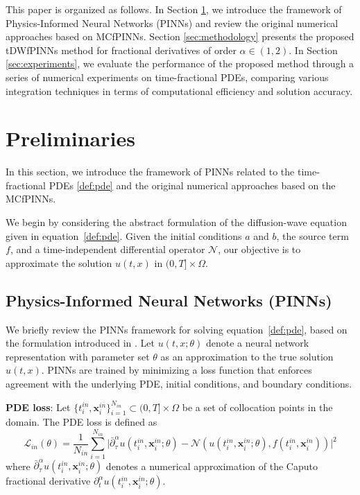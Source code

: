 \documentclass[preprint,3p,times]{elsarticle}
\def\al{\alpha}
\def\x{\mathbf{x}}
\def\L{\mathcal{L}}
\def\N{\mathcal{N}}
\def\al{\alpha}
\def\dta{\partial_t^\alpha}
\def\btau{\bar\partial_\tau^\al}
\begin{document}
This paper is organized as follows. In Section \ref{sec:setup}, we introduce the framework of Physics-Informed Neural Networks (PINNs) and review the original numerical approaches based on MCfPINNs. Section \ref{sec:methodology} presents the proposed tDWfPINNs method for fractional derivatives of order $\alpha \in (1, 2)$. In Section \ref{sec:experiments}, we evaluate the performance of the proposed method through a series of numerical experiments on time-fractional PDEs, comparing various integration techniques in terms of computational efficiency and solution accuracy.






\section{Preliminaries}
\label{sec:setup}
 In this section, we introduce the framework of PINNs related to the time-fractional PDEs \eqref{def:pde} and the original numerical approaches based on the MCfPINNs. 
 
 We begin by considering the abstract formulation of the diffusion-wave equation given in equation~\eqref{def:pde}. Given the initial conditions $a$ and $b$, the source term $f$, and a time-independent differential operator $\N$, our objective is to approximate the solution $u(t,x)$ in $(0,T]\times\Omega$.
\subsection{Physics-Informed Neural Networks (PINNs)}
We briefly review the PINNs framework for solving equation~\eqref{def:pde}, based on the formulation introduced in \cite{RaissiParisGE:2019:JCP}. Let $u(t,x;\theta)$ denote a neural network representation with parameter set $\theta$ as an approximation to the true solution $u(t,x)$. PINNs are trained by minimizing a loss function that enforces agreement with the underlying PDE, initial conditions, and boundary conditions. 

\textbf{PDE loss}: Let $\{t_i^{in}, \x_{i}^{in}\}_{i=1}^{N_{in}} \subset (0,T]\times\Omega$ be a set of collocation points in the domain. The PDE loss is defined as
\begin{equation}
    \label{loss:pde}
    \L_{in}(\theta)= \frac{1}{N_{in}}\sum_{i=1}^{N_{in}}\Bigg|\btau u(t_{i}^{in}, \x_{i}^{in};\theta)-\N(u(t_{i}^{in},\x_{i}^{in};\theta),f(t_{i}^{in},\x_{i}^{in}))\Bigg|^2
\end{equation}
where $\btau u(t_{i}^{in},\x_{i}^{in};\theta)$ denotes a numerical approximation of the Caputo fractional derivative $\dta u(t_{i}^{in},\x_{i}^{in};\theta)$.
\end{document}
